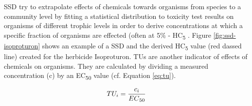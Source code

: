 \iffalse
SSD try to extrapolate effects of chemicals towards organisms from species to a community level by fitting a statistical distribution to toxicity test results on organisms of different trophic levels in order to derive concentrations at which a specific fraction of organisms are effected (often at 5\% - HC\textsubscript{5} \citep{posthuma_species_2002}. Figure \ref{fig:ssd-isoproturon} shows an example of a SSD and the derived HC\textsubscript{5} value (red dassed line) created for the herbicide Isoproturon. TUs are another indicator of effects of chemicals on organisms. They are calculated by dividing a measured concentration (c) by an EC\textsubscript{50} value (cf. Equation \ref{eq:tu}).

\begin{equation}
    TU_i = \frac{c_i}{EC\textsubscript{50}}
    \label{eq:tu}
\end{equation}

